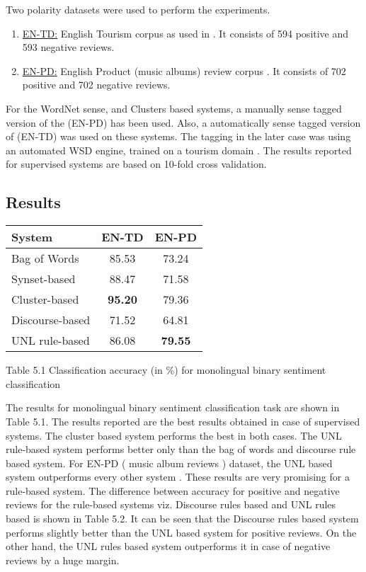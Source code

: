 Two polarity datasets were used to perform the experiments. 
    
\begin{enumerate}
  \item \underline{EN-TD:} English Tourism corpus as used in \citep*{ye2009sentiment}. It consists of 594 positive and 593 negative reviews.
  \item \underline{EN-PD:} English Product (music albums) review corpus \citep*{blitzer2007biographies}. It consists of 702 positive and 702 negative 
  reviews. 
\end{enumerate}
   
For the WordNet sense, and Clusters based systems, a manually sense tagged version of the (EN-PD) has been used. Also, a automatically sense tagged version of 
(EN-TD) was used on these systems. The tagging in the later case was using an automated WSD engine, trained on a tourism domain \citep*{balamurali2013lost}.
The results reported for supervised systems are based on 10-fold cross validation.
   
\subsection{Results}\label{results}

\begin{center}
  \begin{tabular}[h]{|l|c|c|}
   \hline
   \textbf{System} & \textbf{EN-TD} & \textbf{EN-PD} \\ \hline \hline
   Bag of Words & 85.53 & 73.24 \\ \hline
   Synset-based & 88.47 & 71.58 \\ \hline
   Cluster-based & \textbf{95.20} & 79.36 \\ \hline
   Discourse-based & 71.52 & 64.81 \\ \hline
   UNL rule-based & 86.08 & \textbf{79.55} \\ \hline
   \hline
  \end{tabular}
\end{center}
\begin{center}
 Table 5.1 Classification accuracy (in \%) for monolingual binary sentiment classification
\end{center}

  
The results for monolingual binary sentiment classification task are shown in Table 5.1. The results reported are the best results obtained in 
case of supervised systems. The cluster based system performs the best in both cases. The UNL rule-based system performs better only than the bag of words
and discourse rule based system. For EN-PD ( music album reviews ) dataset, the UNL based system outperforms every other system . These results are very promising 
for a rule-based system. The difference between accuracy for positive and negative reviews for the rule-based systems viz. Discourse rules based and UNL rules based 
is shown in Table 5.2. It can be seen that the Discourse rules based system performs slightly better than the UNL based system for positive 
reviews. On the other hand, the UNL rules based system outperforms it in case of negative reviews by a huge margin. 
  
